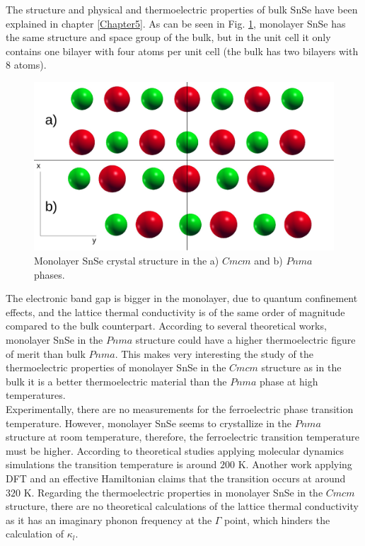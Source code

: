 The structure and physical and thermoelectric properties of bulk SnSe have been explained in chapter \ref{Chapter5}. 
As can be seen in Fig. \ref{pnma-cmcm-mono}, monolayer SnSe has the same structure and space group of the bulk, but 
in the unit cell it only contains one bilayer with four atoms per unit cell (the bulk has two bilayers with 8 atoms). 
\begin{figure}[h]
\begin{center}
\includegraphics[width=0.8\linewidth]{Figures/monolayer-structure.pdf}
\caption{Monolayer SnSe crystal structure in the a) $Cmcm$ and b) $Pnma$ phases.}
\label{pnma-cmcm-mono}
\end{center}
\end{figure}
The electronic band gap is bigger in the monolayer\cite{wang2015thermoelectric,hu2017high}, due to quantum 
confinement effects, and the lattice thermal conductivity is of the same order of 
magnitude\cite{wang2015thermoelectric,hu2017high} compared to the bulk counterpart. According to several theoretical 
works, monolayer SnSe in the $Pnma$ structure could have a higher thermoelectric figure of 
merit\cite{wang2015thermoelectric,hu2017high} than bulk $Pnma$. This makes very interesting the study of the 
thermoelectric properties of monolayer SnSe in the $Cmcm$ structure as in the bulk it is a better thermoelectric 
material than the $Pnma$ phase at high temperatures. \\

Experimentally, there are no measurements for the ferroelectric phase transition temperature. However, monolayer 
SnSe seems to crystallize in the $Pnma$ structure at room temperature\cite{li2013single}, therefore, the 
ferroelectric transition temperature must be higher. According to theoretical studies applying molecular dynamics 
simulations\cite{mehboudi2016structural,barraza2018tuning} the transition temperature is around $200$ K. Another 
work applying DFT and an effective Hamiltonian claims\cite{fei2016ferroelectricity} that the transition occurs at 
around $320$ K. Regarding the thermoelectric properties in monolayer SnSe in the $Cmcm$ structure, there are no 
theoretical calculations of the lattice thermal conductivity as it has an imaginary phonon frequency at the $\Gamma$ 
point, which hinders the calculation of $\kappa_{l}$. \\


